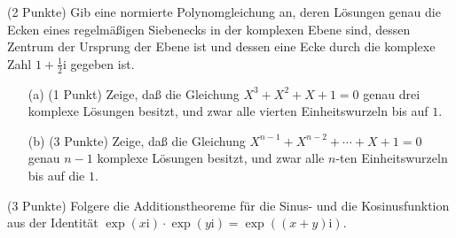 \documentclass{algsheet}
\begin{document}
\begin{exercise}(2 Punkte)\newline
    Gib eine normierte Polynomgleichung an, deren Lösungen genau die Ecken
    eines regelmäßigen Siebenecks in der komplexen Ebene sind, dessen Zentrum
    der Ursprung der Ebene ist und dessen eine Ecke durch die komplexe
    Zahl \(1 + \frac 1 2 \mathrm i\) gegeben ist.
\end{exercise}

\begin{exercise}
\begin{enumerate}
 \item[(a)]  (1 Punkt)\newline
    Zeige, daß die Gleichung \(X^3 + X^2 + X + 1 = 0\) genau drei komplexe
    Lösungen besitzt, und zwar alle vierten Einheitswurzeln bis auf \(1\).


\item[(b)](3 Punkte)\newline
    Zeige, daß die Gleichung \(X^{n - 1} + X^{n - 2} + \dotsb + X + 1 = 0\)
    genau \(n - 1\) komplexe Lösungen besitzt, und zwar alle \(n\)-ten
    Einheitswurzeln bis auf die \(1\).
\end{enumerate}
\end{exercise}

\begin{exercise}(3 Punkte)\newline
    Folgere die Additionstheoreme für die Sinus- und die Kosinusfunktion aus der
    Identität
    \(\exp({x \mathrm i}) \cdot \exp({y \mathrm i}) = \exp({(x + y) \mathrm i})\).
\end{exercise}
\end{document}
